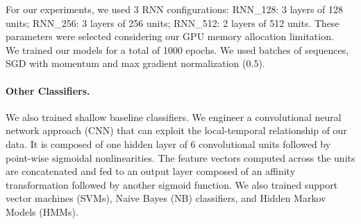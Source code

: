 \documentclass{llncs}
\begin{document}
For our experiments, we used 3 RNN configurations: RNN\_128: 3 layers of 128 units;  RNN\_256: 3 layers of 256 units; RNN\_512: 2 layers of 512  units. These parameters were selected considering our GPU memory allocation limitation.\\
We trained our models for a total of 1000 epochs. We used batches of sequences, SGD with momentum and max gradient normalization (0.5). 
\vspace*{-\baselineskip}
\paragraph{Other Classifiers.} We also trained shallow baseline classifiers. We engineer a convolutional neural network approach (CNN) that can exploit the local-temporal relationship of our data.  It is composed of one hidden layer of 6 convolutional units followed by point-wise sigmoidal nonlinearities. The feature vectors computed across the units are concatenated and fed to an output layer composed of an affinity transformation followed by another sigmoid function. We also trained support vector machines ({SVMs}), Naive Bayes ({NB}) classifiers, and Hidden Markov Models ({HMMs}). %
\vspace*{-\baselineskip}
\end{document}
